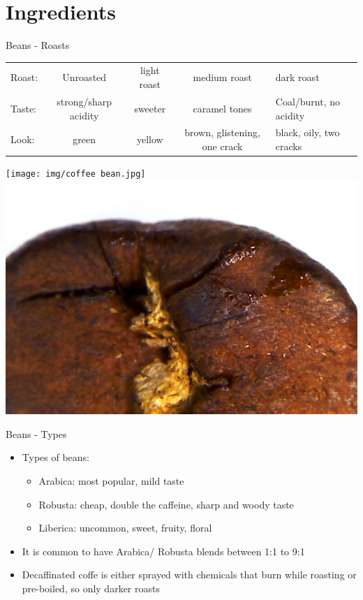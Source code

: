 \documentclass[10pt,graphics,aspectratio=169,table]{beamer}
\begin{document}
\section{Ingredients}
\begin{frame}{Beans - Roasts}
\begin{tabular}{l|| c|c| c| p{6cm}}
    Roast: & Unroasted & light roast & medium roast & dark roast \\
    Taste:  & strong/sharp acidity & sweeter & caramel tones & Coal/burnt, no acidity \\
    Look: & green & yellow & brown, glistening, one crack & black, oily, two cracks\\
\end{tabular}   
\texttt{[image: img/coffee bean.jpg]}
\includegraphics[scale=0.2]{img/Roasted-coffee-scorch-oil.jpg} \cite{roastingBean}
\end{frame}
\begin{frame}{Beans - Types}
\begin{itemize}
    \item Types of beans: 
    \begin{itemize}
        \item Arabica: most popular, mild taste
        \item Robusta: cheap, double the caffeine, sharp and woody taste
        \item Liberica: uncommon, sweet, fruity, floral
    \end{itemize}
    \item It is common to have Arabica/ Robusta blends between 1:1 to 9:1
    \item Decaffinated coffe is either sprayed with chemicals that burn while roasting or pre-boiled, so only darker roasts
    \end{itemize}
\end{frame}
\end{document}
